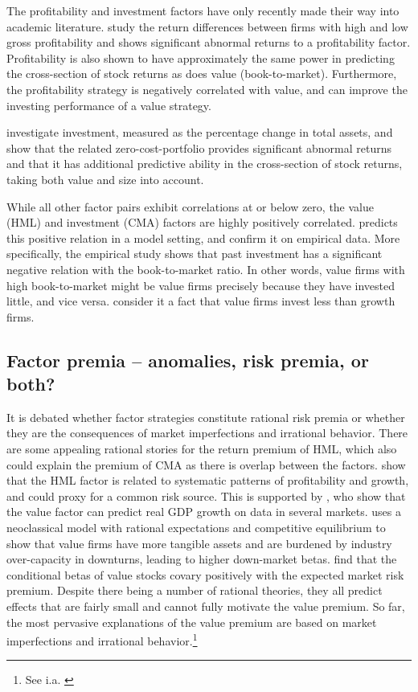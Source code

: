 The profitability and investment factors have only recently made their way into academic literature. \textcite{NovyMarx2013} study the return differences between firms with high and low gross profitability and shows significant abnormal returns to a profitability factor. Profitability is also shown to have approximately the same power in predicting the cross-section of stock returns as does value (book-to-market). Furthermore, the profitability strategy is negatively correlated with value, and can improve the investing performance of a value strategy. 

\textcite{CooperGulenSchill2008} investigate investment, measured as the percentage change in total assets, and show that the related zero-cost-portfolio provides significant abnormal returns and that it has additional predictive ability in the cross-section of stock returns, taking both value and size into account.

While all other factor pairs exhibit correlations at or below zero, the value (HML) and investment (CMA) factors are highly positively correlated. \textcite{Zhang2005} predicts this positive relation in a model setting, and \textcite{AndersonGarciaFeijoo2006} confirm it on empirical data. More specifically, the empirical study shows that past investment has a significant negative relation with the book-to-market ratio. In other words, value firms with high book-to-market might be value firms precisely because they have invested little, and vice versa. \textcite{FF2015} consider it a fact that value firms invest less than growth firms.

\subsection{Factor premia -- anomalies, risk premia, or both?}
It is debated whether factor strategies constitute rational risk premia or whether they are the consequences of market imperfections and irrational behavior. There are some appealing rational stories for the return premium of HML, which also could explain the premium of CMA as there is overlap between the factors. \textcite{FamaFrench1993} show that the HML factor is related to systematic patterns of profitability and growth, and could proxy for a common risk source. This is supported by \textcite{LiewVassalou2000}, who show that the value factor can predict real GDP growth on data in several markets. \textcite{Zhang2005} uses a neoclassical model with rational expectations and competitive equilibrium to show that value firms have more tangible assets and are burdened by industry over-capacity in downturns, leading to higher down-market betas. \textcite{PetkovaZhang2005} find that the conditional betas of value stocks covary positively with the expected market risk premium. Despite there being a number of rational theories, they all predict effects that are fairly small and cannot fully motivate the value premium. So far, the most pervasive explanations of the value premium are based on market imperfections and irrational behavior.\footnote{See i.a. \textcite{Ilmanen2011}}

